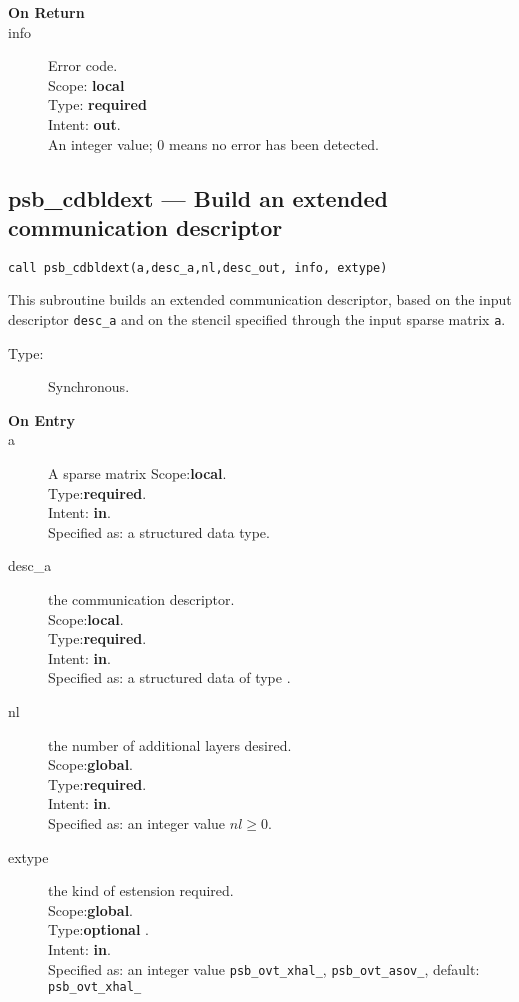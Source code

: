 \begin{description}
\item[\bf On Return]
\item[info] Error code.\\
Scope: {\bf local} \\
Type: {\bf required} \\
Intent: {\bf out}.\\
An integer value; 0 means no error has been detected. 
\end{description}



%
%
\clearpage\subsection*{psb\_cdbldext --- Build an extended  communication
  descriptor}

\begin{verbatim}
call psb_cdbldext(a,desc_a,nl,desc_out, info, extype)
\end{verbatim}

This subroutine builds an extended communication descriptor, based on
the input descriptor \verb|desc_a| and on the stencil specified
through the input sparse matrix \verb|a|. 
\begin{description}
\item[Type:] Synchronous.
\item[\bf On Entry]
\item[a] A sparse matrix
Scope:{\bf local}.\\
Type:{\bf required}.\\
Intent: {\bf in}.\\
Specified as: a structured data type.
\item[desc\_a] the communication descriptor.\\
Scope:{\bf local}.\\
Type:{\bf required}.\\
Intent: {\bf in}.\\
Specified as: a structured data of type \spdata.
\item[nl] the number of additional layers desired.\\
Scope:{\bf global}.\\
Type:{\bf required}.\\
Intent: {\bf in}.\\
Specified as: an integer value $nl\ge 0$. 
\item[extype] the kind of estension required.\\
Scope:{\bf global}.\\
Type:{\bf optional }.\\
Intent: {\bf in}.\\
Specified as: an integer value
\verb|psb_ovt_xhal_|, \verb|psb_ovt_asov_|, default: \verb|psb_ovt_xhal_|

\end{description}

